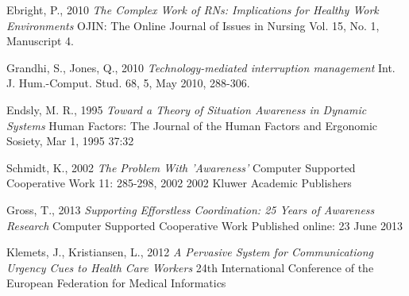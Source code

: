 \documentclass[b5paper, 11pt, norsk]{MScthesisITEM}
\begin{document}
\begin{thebibliography}{99}
Ebright, P., 2010
\emph {The Complex Work of RNs: Implications for Healthy Work Environments}
OJIN: The Online Journal of Issues in Nursing Vol. 15, No. 1, Manuscript 4.

Grandhi, S., Jones, Q., 2010
\emph {Technology-mediated interruption management} Int. J. Hum.-Comput. Stud. 68, 5, May 2010, 288-306.

Endsly, M. R., 1995
\emph{Toward a Theory of Situation Awareness in Dynamic Systems}
Human Factors: The Journal of the Human Factors and Ergonomic Sosiety, Mar 1, 1995 37:32

Schmidt, K., 2002
\emph{The Problem With 'Awareness'}
Computer Supported Cooperative Work 11: 285-298, 2002
2002 Kluwer Academic Publishers

Gross, T., 2013
\emph{Supporting Efforstless Coordination: 25 Years of Awareness Research}
Computer Supported Cooperative Work
Published online: 23 June 2013

Klemets, J., Kristiansen, L., 2012
\emph{A Pervasive System for Communicationg Urgency Cues to Health Care Workers}
24th International Conference of the European Federation for Medical Informatics


\end{thebibliography}

\end{document}
